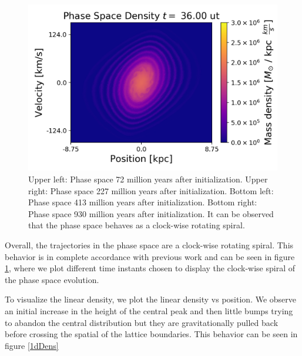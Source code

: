 \begin{figure}[h!]
    \includegraphics[scale=0.45]{imag/gauss90.png}
    \caption{Upper left: Phase space 72 million years after initialization. Upper right: Phase space 227 million years after initialization. Bottom left: Phase space 413 million years after initialization. Bottom right: Phase space 930 million years after initialization. It can be observed that the phase space behaves as a clock-wise rotating spiral.}
    \label{1dphase}
\end{figure}


Overall, the trajectories in the phase space are a clock-wise rotating spiral. This behavior is in complete accordance with previous work and can be seen in figure \ref{1dphase}, where we plot different time instants chosen to display the clock-wise spiral of the phase space evolution.

To visualize the linear density, we plot the linear density vs position. We observe an initial increase in the height of the central peak and then little bumps trying to abandon the central distribution but they are gravitationally pulled back before crossing the spatial of the lattice boundaries. This behavior can be seen in figure \ref{1dDens}





